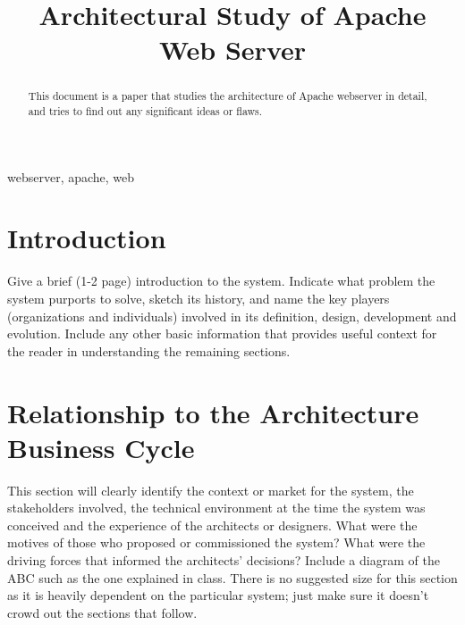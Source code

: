 \documentclass[conference, onecolumn]{IEEEtran}
\begin{document}
\title{Architectural Study of Apache Web Server\\
}

\author{
}

\maketitle

\begin{abstract}
This document is a paper that studies the architecture of Apache webserver in detail, and tries to find out any significant ideas or flaws.
\end{abstract}

\begin{IEEEkeywords}
    webserver, apache, web
\end{IEEEkeywords}

\section{Introduction}
\color{blue}
Give a brief (1-2 page) introduction to the system. Indicate what problem the system purports to solve, sketch its history, and name the key players (organizations and individuals) involved in its definition, design, development and evolution. Include any other basic information that provides useful context for the reader in understanding the remaining sections.
\color{black}

\section{Relationship to the Architecture Business Cycle}
\color{blue}
This section will clearly identify the context or market for the system, the stakeholders involved, the technical environment at the time the system was conceived and the experience of the architects or designers. What were the motives of those who proposed or commissioned the system? What were the driving forces that informed the architects' decisions? Include a diagram of the ABC such as the one explained in class. There is no suggested size for this section as it is heavily dependent on the particular system; just make sure it doesn't crowd out the sections that follow.
\color{black}
\end{document}
